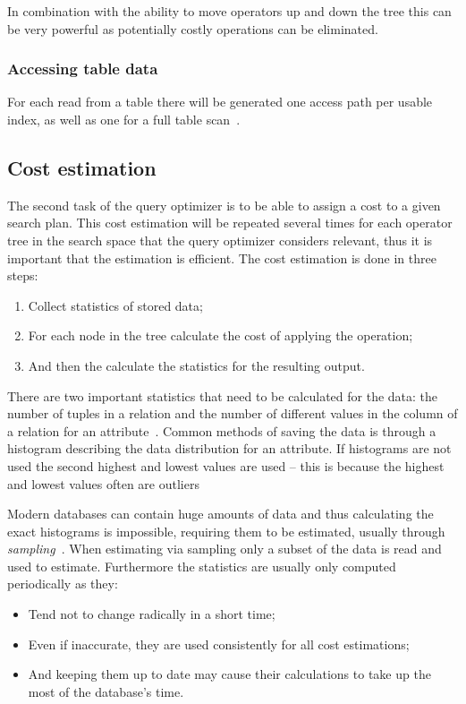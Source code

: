 In combination with the ability to move operators up and down the tree this can
be very powerful as potentially costly operations can be eliminated.

\subsubsection{Accessing table data}
For each read from a table there will be generated one access path per usable
index, as well as one for a full table
scan~\cite[p.~827-829]{garcia-molina_2002_database_dstcb}.

\subsection{Cost estimation}
The second task of the query optimizer is to be able to assign a cost to a given
search plan. This cost estimation will be repeated several times for each
operator tree in the search space that the query optimizer considers relevant,
thus it is important that the estimation is efficient. The cost estimation is
done in three steps:
\begin{enumerate}
\item Collect statistics of stored data;
\item For each node in the tree calculate the cost of applying the operation;
\item And then the calculate the statistics for the resulting output.
\end{enumerate}

There are two important statistics that need to be calculated for the data: the
number of tuples in a relation and the number of different values in the column
of a relation for an attribute~\cite[p.
807-808]{garcia-molina_2002_database_dstcb}. Common methods of saving the data
is through a histogram describing the data distribution for an attribute. If
histograms are not used the second highest and lowest values are used – this is
because the highest and lowest values often are outliers

Modern databases can contain huge amounts of data and thus calculating the exact
histograms is impossible, requiring them to be estimated, usually through
\textit{sampling}~\cite[p. 807-808]{garcia-molina_2002_database_dstcb}. When
estimating via sampling only a subset of the data is read and used to estimate.
Furthermore the statistics are usually only computed periodically as they:
\begin{itemize}
\item Tend not to change radically in a short time;
\item Even if inaccurate, they are used consistently for all cost estimations;
\item And keeping them up to date may cause their calculations to take up the
  most of the database's time.
\end{itemize}

